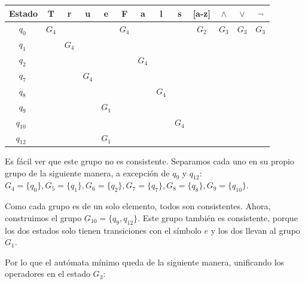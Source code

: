 \documentclass[12pt, letterpaper]{article}
\begin{document}
\begin{enumerate}
    \begin{table}[htbp]
      \centering
      \setlength{\tabcolsep}{5pt}
      \renewcommand{\arraystretch}{1.3} %
      \begin{tabular}{r l | c c c c c c c c c c c c}
        \toprule
        \multicolumn{2}{c|}{\textbf{Estado}} & \textbf{T} & \textbf{r} & \textbf{u} & \textbf{e} & \textbf{F} & \textbf{a} & \textbf{l} & \textbf{s} & \textbf{[a-z]} & $\boldsymbol{\wedge}$ & $\boldsymbol{\vee}$ & $\boldsymbol{\neg}$ \\
        \midrule
        $q_0$    &    & $G_4$ & & & & $G_4$ & & & & $G_2$ & $G_3$ & $G_3$ & $G_3$ \\
        $q_1$    &    & & $G_4$ & & & & & & & & & & \\
        $q_2$    &    & & & & & & $G_4$ & & & & & & \\
        $q_7$    &    & & & $G_4$ & & & & & & & & & \\
        $q_8$    &    & & & & & & & $G_4$ & & & & & \\
        $q_9$    &    & & & & $G_1$ & & & & & & & & \\
        $q_{10}$ &    & & & & & & & & $G_4$ & & & & \\
        $q_{12}$ &    & & & & $G_1$ & & & & & & & & \\
        \bottomrule
      \end{tabular}
      \label{tab:afd_minimizado_paso1}
    \end{table}

    Es fácil ver que este grupo no es consistente. Separamos cada uno en su propio grupo de la siguiente manera, a excepción de $q_9$ y $q_{12}$:
    $G_4=\{q_0\}, G_5=\{q_1\}, G_6=\{q_2\}, G_7=\{q_7\}, G_8=\{q_8\}, G_9=\{q_{10}\}$.

    Como cada grupo es de un solo elemento, todos son consistentes.
    Ahora, construimos el grupo $G_{10}=\{q_9, q_{12}\}$. Este grupo también es consistente, porque los dos estados solo tienen transiciones con el símbolo $e$ y los dos llevan al grupo $G_1$.

    Por lo que el autómata mínimo queda de la siguiente manera, unificando los operadores en el estado $G_3$:

    \begin{figure}[htbp]
      \centering
      \begin{tikzpicture}[
          ->, >=Stealth, auto,
          node distance=1.6cm and 1.6cm,
          every state/.style={thick},
          initial text=,
          scale=0.95, every node/.style={scale=0.95}
        ]


\end{tikzpicture}
\end{figure}
\end{enumerate}
\end{document}
